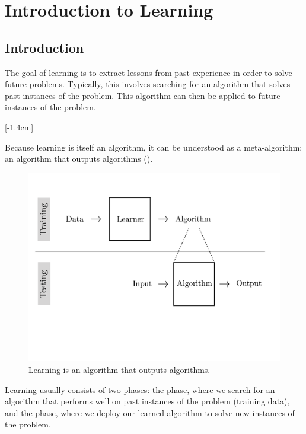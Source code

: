 

\chapter{Introduction to Learning}
\label{chapter:intro_to_learning}

\section{Introduction}
The goal of learning is to extract lessons from past experience in order to solve future problems. Typically, this involves searching for an algorithm that solves past instances of the problem. This algorithm can then be applied to future instances of the problem.

[-1.4cm]

Because learning is itself an algorithm, it can be understood as a meta-algorithm: an algorithm that outputs algorithms (\fig{\ref{fig:learning_as_meta_algorithm}}).

\begin{figure}[h!]
    \centerline{
        \includegraphics[width=0.75\linewidth]{./figures/intro_to_learning/learning_as_meta_algorithm.pdf}
    }
    \caption{Learning is an algorithm that outputs algorithms.}
    \label{fig:learning_as_meta_algorithm}
\end{figure}

Learning usually consists of two phases: the  phase, where we search for an algorithm that performs well on past instances of the problem (training data), and the  phase, where we deploy our learned algorithm to solve new instances of the problem.


